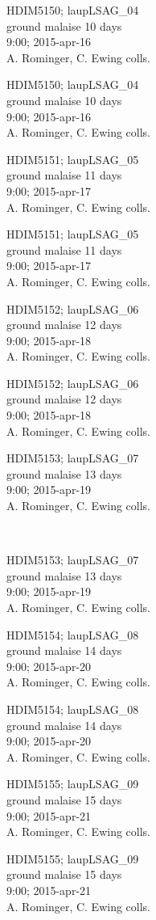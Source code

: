 \documentclass[6pt]{article}
\begin{document}
\noindent
\parbox{0.135\textwidth}{\tiny HDIM5150; laupLSAG\_04\\ ground malaise  10 days\\ 9:00; 2015-apr-16\\ A. Rominger, C. Ewing colls.}
\parbox{0.135\textwidth}{\tiny HDIM5150; laupLSAG\_04\\ ground malaise  10 days\\ 9:00; 2015-apr-16\\ A. Rominger, C. Ewing colls.}
\parbox{0.135\textwidth}{\tiny HDIM5151; laupLSAG\_05\\ ground malaise  11 days\\ 9:00; 2015-apr-17\\ A. Rominger, C. Ewing colls.}
\parbox{0.135\textwidth}{\tiny HDIM5151; laupLSAG\_05\\ ground malaise  11 days\\ 9:00; 2015-apr-17\\ A. Rominger, C. Ewing colls.}
\parbox{0.135\textwidth}{\tiny HDIM5152; laupLSAG\_06\\ ground malaise  12 days\\ 9:00; 2015-apr-18\\ A. Rominger, C. Ewing colls.}
\parbox{0.135\textwidth}{\tiny HDIM5152; laupLSAG\_06\\ ground malaise  12 days\\ 9:00; 2015-apr-18\\ A. Rominger, C. Ewing colls.}
\parbox{0.135\textwidth}{\tiny HDIM5153; laupLSAG\_07\\ ground malaise  13 days\\ 9:00; 2015-apr-19\\ A. Rominger, C. Ewing colls.} \\ 
\vspace{0.001in} 

\noindent
\parbox{0.135\textwidth}{\tiny HDIM5153; laupLSAG\_07\\ ground malaise  13 days\\ 9:00; 2015-apr-19\\ A. Rominger, C. Ewing colls.}
\parbox{0.135\textwidth}{\tiny HDIM5154; laupLSAG\_08\\ ground malaise  14 days\\ 9:00; 2015-apr-20\\ A. Rominger, C. Ewing colls.}
\parbox{0.135\textwidth}{\tiny HDIM5154; laupLSAG\_08\\ ground malaise  14 days\\ 9:00; 2015-apr-20\\ A. Rominger, C. Ewing colls.}
\parbox{0.135\textwidth}{\tiny HDIM5155; laupLSAG\_09\\ ground malaise  15 days\\ 9:00; 2015-apr-21\\ A. Rominger, C. Ewing colls.}
\parbox{0.135\textwidth}{\tiny HDIM5155; laupLSAG\_09\\ ground malaise  15 days\\ 9:00; 2015-apr-21\\ A. Rominger, C. Ewing colls.}
\end{document}

